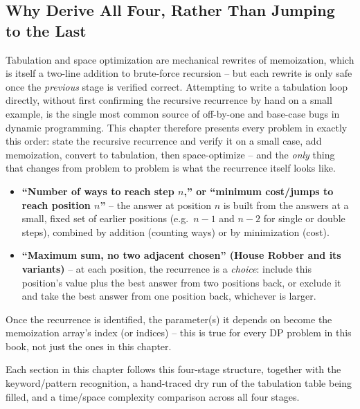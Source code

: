 \subsection*{Why Derive All Four, Rather Than Jumping to the Last}

Tabulation and space optimization are mechanical rewrites of memoization,
which is itself a two-line addition to brute-force recursion -- but each
rewrite is only safe once the \emph{previous} stage is verified correct.
Attempting to write a tabulation loop directly, without first confirming
the recursive recurrence by hand on a small example, is the single most
common source of off-by-one and base-case bugs in dynamic programming.
This chapter therefore presents every problem in exactly this order:
state the recursive recurrence and verify it on a small case, add
memoization, convert to tabulation, then space-optimize -- and the
\emph{only} thing that changes from problem to problem is what the
recurrence itself looks like.

\begin{patternbox}
\begin{itemize}
  \item \textbf{``Number of ways to reach step $n$,'' or ``minimum
        cost/jumps to reach position $n$''} -- the answer at position
        $n$ is built from the answers at a small, fixed set of earlier
        positions (e.g.\ $n-1$ and $n-2$ for single or double steps),
        combined by addition (counting ways) or by minimization (cost).
  \item \textbf{``Maximum sum, no two adjacent chosen'' (House Robber and
        its variants)} -- at each position, the recurrence is a
        \emph{choice}: include this position's value plus the best
        answer from two positions back, or exclude it and take the best
        answer from one position back, whichever is larger.
\end{itemize}
Once the recurrence is identified, the parameter(s) it depends on become
the memoization array's index (or indices) -- this is true for every DP
problem in this book, not just the ones in this chapter.
\end{patternbox}

Each section in this chapter follows this four-stage structure, together
with the keyword/pattern recognition, a hand-traced dry run of the
tabulation table being filled, and a time/space complexity comparison
across all four stages.

\newpage







